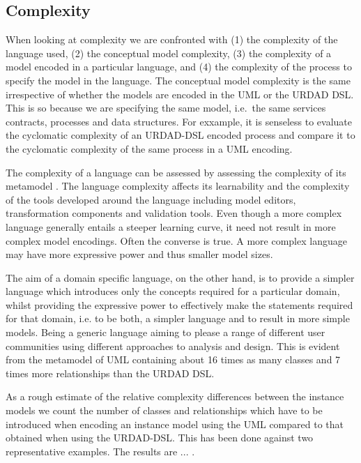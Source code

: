 
\subsection{Complexity}

When looking at complexity we are confronted with (1) the complexity of the language used, (2) the conceptual model complexity, (3) the complexity of a model encoded in a particular language, and (4) the complexity of the process to specify the model in the language. The conceptual model complexity is the same irrespective of whether the models are encoded in the UML or the URDAD DSL. This is so because we are specifying the same model, i.e.\ the same services contracts, processes and data structures. For exxample, it is senseless to evaluate the cyclomatic complexity \cite{mccabe_complexity_1976} of an URDAD-DSL encoded process and compare it to the cyclomatic complexity of the same process in a UML encoding.

The complexity of a language can be assessed by assessing the complexity of its metamodel \cite{mohagheghi_evaluating_2007}. The language complexity affects its learnability and the complexity of the tools developed around the language including model editors, transformation components and validation tools. Even though a more complex language generally entails a steeper learning curve, it need not result in more complex model encodings. Often the converse is true. A more complex language may have more expressive power and thus smaller model sizes. 

The aim of a domain specific language, on the other hand, is to provide a simpler language which introduces only the concepts required for a particular domain, whilst providing the expressive power to effectively make the statements required for that domain, i.e. to be both, a simpler language and to result in more simple models. Being a generic language aiming to please a range of different user communities using different approaches to analysis and design. This is evident from the metamodel of UML containing about 16 times as many classes and 7 times more relationships than the URDAD DSL.

As a rough estimate of the relative complexity differences between the instance models we count the number of classes and relationships which have to be introduced when encoding an instance model using the UML compared to that obtained when using the URDAD-DSL. This has been done against two representative examples. The results are ... . 


